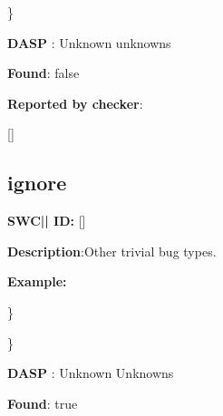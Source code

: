 \documentclass{article}
\begin{document}
\} 

\textbf{DASP} : Unknown unknowns

\textbf{Found}: false

\textbf{Reported by checker}: 
\begin{ffcode} 

[]
\end{ffcode} 
\subsection{ignore} 
\textbf{SWC{|\textunderscore| }ID:} []

\textbf{Description}:Other trivial bug types.


\textbf{Example:} 
\begin{ffcode} 


\end{ffcode} 
\} 

\} 

\textbf{DASP} : Unknown Unknowns

\textbf{Found}: true
\end{document}
